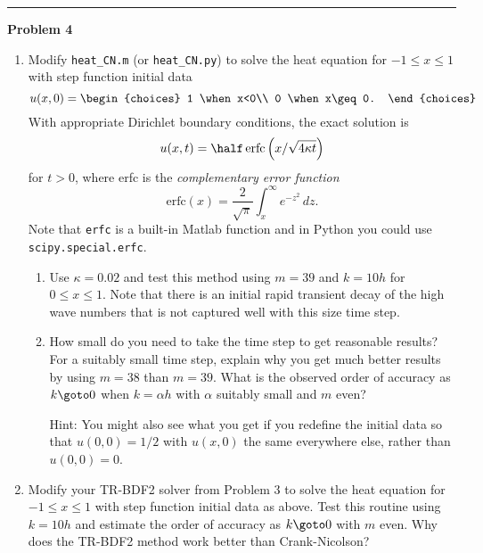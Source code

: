 \documentclass[10pt]{article}
\begin{document}



\vskip 1cm
\hrule
{\bf Problem 4}  


\begin{enumerate}

\item Modify \verb+heat_CN.m+  (or \verb+heat_CN.py+)
to solve the heat equation for
$-1\leq x \leq 1$ with step function  initial data
\begin{equation} \label{9.3a}
u(x,0) = \begin{choices}  1 \when x<0\\  0 \when x\geq 0. \end{choices}
\end{equation} 
With appropriate Dirichlet boundary conditions, the exact solution is
\begin{equation} \label{9.3b}
u(x,t) = \half \, \text{erfc} \left(x / \sqrt{4 \kappa t}\right)
\end{equation} 
for $t>0$, where erfc is the {\em complementary error function}
\[
\text{erfc}(x) = \frac{2}{\sqrt{\pi}} \int_x^\infty e^{-z^2}\,dz.
\]
Note that {\tt erfc} is a built-in Matlab function and in Python you could
use \verb+scipy.special.erfc+.

\begin{enumerate}
\item
Use $\kappa = 0.02$ and
test this method using $m=39$ and $k = 10h$ for $0\leq x \leq 1$.  
Note that there is an initial rapid transient decay of the high
wave numbers that is not captured well with this size time step.

\item
How small do you need to take the time step to get reasonable results?
For a suitably small time step, explain why you get much better results by
using $m=38$ than $m=39$.  What is the observed order of accuracy as $k\goto
0$ when $k = \alpha h$ with $\alpha$ suitably small and $m$ even?

Hint: You might also see what you get if you redefine the initial data so
that $u(0,0)=1/2$ with $u(x,0)$ the same everywhere else, rather than
$u(0,0) = 0$.

\end{enumerate}

\item Modify your TR-BDF2 solver from Problem 3
to solve the heat equation for
$-1\leq x \leq 1$ with step function  initial data as above.
Test this routine using $k=10h$ and estimate the order of accuracy as
$k\goto 0$ with $m$ even.  Why does the TR-BDF2 method work better than
Crank-Nicolson?

\end{enumerate} 





\end{document}
